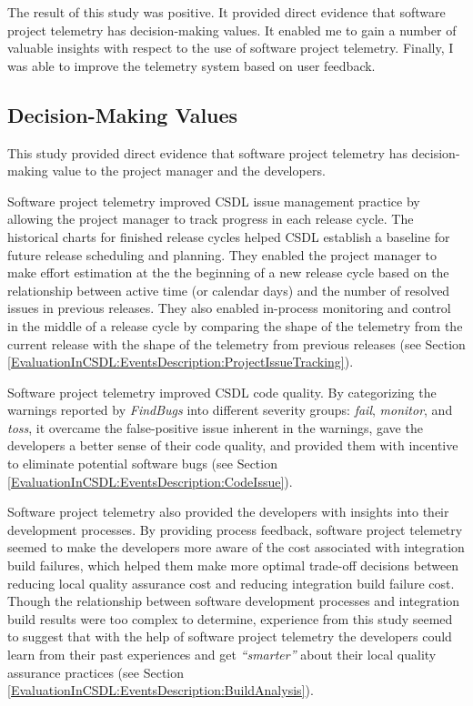 The result of this study was positive. It provided direct evidence that software project telemetry has decision-making values. It enabled me to gain a number of valuable insights with respect to the use of software project telemetry. Finally, I was able to improve the telemetry system based on user feedback. 



\subsection{Decision-Making Values}

This study provided direct evidence that software project telemetry has decision-making value to the project manager and the developers. 

Software project telemetry improved CSDL issue management practice by allowing the project manager to track progress in each release cycle. The historical charts for finished release cycles helped CSDL establish a baseline for future release scheduling and planning. They enabled the project manager to make effort estimation at the the beginning of a new release cycle based on the relationship between active time (or calendar days) and the number of resolved issues in previous releases. They also enabled in-process monitoring and control in the middle of a release cycle by comparing the shape of the telemetry from the current release with the shape of the telemetry from previous releases (see Section \ref{EvaluationInCSDL:EventsDescription:ProjectIssueTracking}). 

Software project telemetry improved CSDL code quality. By categorizing the warnings reported by 
\textit{FindBugs} into different severity groups: \textit{fail}, \textit{monitor}, and \textit{toss}, it overcame the false-positive issue inherent in the warnings, gave the developers a better sense of their code quality, and provided them with incentive to eliminate potential software bugs (see Section \ref{EvaluationInCSDL:EventsDescription:CodeIssue}).

Software project telemetry also provided the developers with insights into their development processes. By providing process feedback, software project telemetry seemed to make the developers more aware of the cost associated with integration build failures, which helped them make more optimal trade-off decisions between reducing local quality assurance cost and reducing integration build failure cost. Though the relationship between software development processes and integration build results were too complex to determine, experience from this study seemed to suggest that with the help of software project telemetry the developers could learn from their past experiences and get \textit{``smarter''} about their local quality assurance practices (see Section \ref{EvaluationInCSDL:EventsDescription:BuildAnalysis}).





